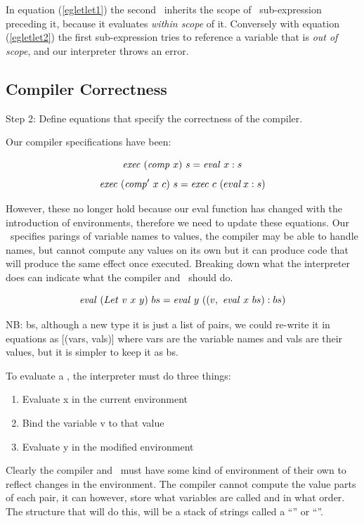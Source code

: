 \documentclass {article}
\begin{document}
In equation (\ref{egletlet1})
the second \add\ inherits
the scope of \leet\ sub-expression 
preceding it, 
because it evaluates
\emph{within scope} of it.
Conversely with equation (\ref{egletlet2})
the first sub-expression tries to reference
a variable that is \emph{out of scope},
and our interpreter throws an error.

\subsection{Compiler Correctness}

Step 2: Define equations that specify the
	correctness of the compiler.

Our compiler specifications have been:

	\[ \mathit{exec\ }  (\mathit{comp\ }  x)\  s = \mathit{eval\ }   x:s \]
	\[ \mathit{exec\ }  (\mathit{comp'\ }   x\  c)\ s = \mathit{exec\ }  c\  (eval \, x:s) \]

However, these no longer hold
because our eval function has changed
with the introduction of environments,
therefore we need to update these equations.
\linebreak
Our \env\ specifies parings of 
variable names to values,
the compiler may be able to handle names,
but cannot compute any 
values on its own
but it can produce code that will
produce the same effect once executed.
Breaking down what the interpreter
does can indicate what the 
compiler and \vm\ should do.

\[\mathit{eval\ } (Let\ v\ x\ y)\ bs 
		= \mathit{eval\ }  y\ ((v,\ \mathit{eval\ }  x\ bs):bs) \]

NB: bs, although a new type it is just a list
of pairs, we could re-write it in equations as
[(vars, vals)] where vars are the variable names
and vals are their values,
but it is simpler to keep it as bs.

To evaluate a \leet, the interpreter
must do three things:
\begin{enumerate}
	\item Evaluate x in the current environment
	\item Bind the variable v to that value
	\item Evaluate y in the modified environment
\end{enumerate}

Clearly the compiler and \vm\ must have some kind of
environment of their own to
reflect changes in the environment.
The compiler cannot compute the value
parts of each pair,
it can however, 
store what variables are called and in what order.
The structure that will do this, will be a 
stack of strings called a ``\Contextt'' or ``\Cxtt''.
\end{document}

